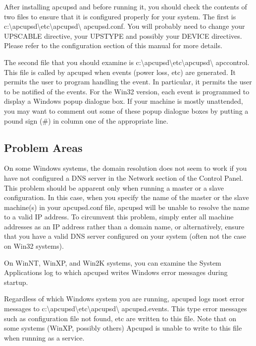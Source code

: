 {{{{{{{\label{index-Windows_002c-Post-Installation-177}
After installing apcupsd and before running it, you should check the contents
of two files to ensure that it is configured properly for your system. The
first is
c:\textbackslash{}apcupsd\textbackslash{}etc\textbackslash{}apcupsd\textbackslash
{}apcupsd.conf. You will probably need to change your UPSCABLE directive, your
UPSTYPE and possibly your DEVICE directives. Please refer to the configuration
section of this manual for more details.  

The second file that you should examine is
c:\textbackslash{}apcupsd\textbackslash{}etc\textbackslash{}apcupsd\textbackslash
{}apccontrol. This file is called by apcupsd when events (power loss, etc) are
generated. It permits the user to program handling the event. In particular,
it permits the user to be notified of the events. For the Win32 version, each
event is programmed to display a Windows popup dialogue box. If your machine
is mostly unattended, you may want to comment out some of these popup dialogue
boxes by putting a pound sign (\#) in column one of the appropriate line. 

\label{Problem-Areas}

\subsection*{Problem Areas}

\label{index-Problems_002c-Windows-178}
\label{index-Windows_002c-Problems-179}
On some Windows systems, the domain resolution does not seem to work if you
have not configured a DNS server in the Network section of the Control Panel.
This problem should be apparent only when running a master or a slave
configuration. In this case, when you specify the name of the master or the
slave machine(s) in your apcupsd.conf file, apcupsd will be unable to resolve
the name to a valid IP address. To circumvent this problem, simply enter all
machine addresses as an IP address rather than a domain name, or
alternatively, ensure that you have a valid DNS server configured on your
system (often not the case on Win32 systems).

On WinNT, WinXP, and Win2K systems, you can examine the System Applications
log to which apcupsd writes Windows error messages during startup.  

Regardless of which Windows system you are running, apcupsd logs most error
messages to
c:\textbackslash{}apcupsd\textbackslash{}etc\textbackslash{}apcupsd\textbackslash
{}apcupsd.events. This type error messages such as configuration file not
found, etc are written to this file. Note that on some systems (WinXP, possibly
others) Apcupsd is unable to write to this file when running as a service.


}}}}}}}

